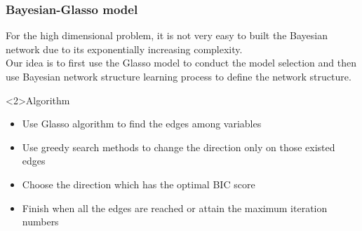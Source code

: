 \documentclass[xcolor={x11names,svgnames,dvipsnames}]{beamer}
\begin{document}
\begin{frame}
\frametitle{Bayesian-Glasso model}
 For the high dimensional problem, it is not very easy to built the Bayesian network due to its exponentially increasing complexity. \\
 Our idea is to first use the Glasso model to conduct the model selection and then use Bayesian network structure learning process
 to define the network structure. \\
   \begin{block}<2>{Algorithm}
    \begin{itemize}
        \item  Use Glasso algorithm to find the edges among variables
        \item  Use greedy search methods to change the direction only on those existed edges
        \item  Choose the direction which has the optimal BIC score
        \item  Finish when all the edges are reached or attain the maximum iteration numbers
    \end{itemize}
  \end{block}

\end{frame}
\end{document}

